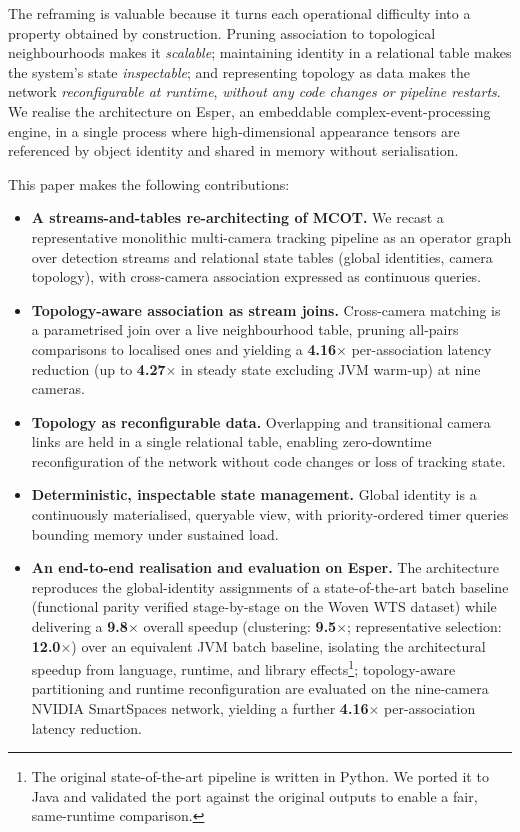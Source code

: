 \documentclass[review]{elsarticle}
\begin{document}
The reframing is valuable because it turns each operational difficulty into a property obtained by construction. Pruning association to topological neighbourhoods makes it \emph{scalable}; maintaining identity in a relational table makes the system's state \emph{inspectable}; and representing topology
as data makes the network \emph{reconfigurable at runtime}, \emph{without any code changes or pipeline restarts}.
We realise the architecture on Esper, an embeddable complex-event-processing engine, in a single process where high-dimensional appearance tensors are referenced by object identity and shared
in memory without serialisation.

This paper makes the following contributions:
\begin{itemize}[leftmargin=*]
    \item \textbf{A streams-and-tables re-architecting of MCOT.} We recast a representative monolithic multi-camera tracking pipeline as an operator graph over detection streams and
    relational state tables (global identities, camera topology), with cross-camera association expressed as continuous queries.
    \item \textbf{Topology-aware association as stream joins.} Cross-camera matching is a parametrised join over a live neighbourhood table, pruning all-pairs comparisons to localised ones and yielding a \textbf{4.16$\times$} per-association latency reduction (up to \textbf{4.27$\times$} in steady state excluding JVM warm-up) at nine cameras.
    \item \textbf{Topology as reconfigurable data.} Overlapping and transitional camera links are held in a single relational table, enabling zero-downtime reconfiguration of the network
    without code changes or loss of tracking state.
    \item \textbf{Deterministic, inspectable state management.} Global identity is a continuously materialised, queryable view, with priority-ordered timer queries bounding memory under sustained load.
    \item \textbf{An end-to-end realisation and evaluation on Esper.} The architecture reproduces the global-identity assignments of a state-of-the-art batch baseline
    (functional parity verified stage-by-stage on the Woven WTS dataset) while delivering a \textbf{9.8$\times$} overall speedup (clustering: \textbf{9.5$\times$};
    representative selection: \textbf{12.0$\times$}) over an equivalent JVM batch baseline, isolating the architectural speedup from language, runtime, and library
    effects\footnote{The original state-of-the-art pipeline is written in Python. We ported it to Java and validated the port against the original outputs to enable a fair, 
    same-runtime comparison.}; topology-aware partitioning and runtime reconfiguration are evaluated on the nine-camera NVIDIA SmartSpaces network, yielding a further
    \textbf{4.16$\times$} per-association latency reduction.
\end{itemize}
\end{document}
